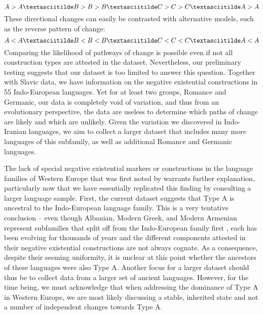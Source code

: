 ﻿\documentclass[output=paper]{langsci/langscibook}
\begin{document}
\begin{equation*}  
A > A{\textasciitilde}B > B > B{\textasciitilde}C > C > C{\textasciitilde}A > A
\end{equation*}
%
These directional changes can easily be contrasted with alternative models, such as the reverse pattern of change:
%
\begin{equation*}  
A < A{\textasciitilde}B < B < B{\textasciitilde}C < C < C{\textasciitilde}A < A
\end{equation*}
%
Comparing the likelihood of pathways of change is possible even if not all construction types are attested in the dataset. Nevertheless, our preliminary testing suggests that our dataset is too limited to answer this question. Together with  Slavic data, we have information on the negative existential constructions in 55 Indo-European languages. Yet for at least two groups, Romance and Germanic, our data is completely void of variation, and thus from an evolutionary perspective, the data are useless to determine which paths of change are likely and which are unlikely. Given the variation we discovered in Indo-Iranian languages, we aim to collect a larger dataset that includes many more languages of this subfamily, as well as additional Romance and Germanic languages. 

The lack of special negative existential markers or constructions in the
language families of Western Europe that was first noted by
\citet[117]{Veselinova2013} warrants further explanation, particularly now
that we have essentially replicated this finding by consulting a larger
language sample. First, the current dataset suggests that Type A is
ancestral to the Indo-European language family. This is a very tentative
conclusion – even though Albanian, Modern Greek, and Modern Armenian
represent subfamilies that split off from the Indo-European family first
\parencite[at least in][]{BouckaertLemey2012}, each has been evolving for
thousands of years and the different components attested in their negative
existential constructions are not always cognate. As a consequence, despite
their seeming uniformity, it is unclear at this point whether the ancestors
of these languages were also Type A. Another focus for a larger dataset
should thus be to collect data from a larger set of ancient languages.
However, for the time being, we must acknowledge that when addressing the
dominance of Type A in Western Europe, we are most likely discussing a
stable, inherited state \parencite[see][19]{Croft1991} and not a number of independent changes towards Type A. 
\end{document}
